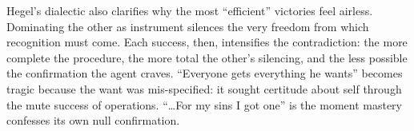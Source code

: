 Hegel's dialectic also clarifies why the most ``efficient'' victories feel airless. Dominating
the other as instrument silences the very freedom from which recognition must come. Each success,
then, intensifies the contradiction: the more complete the procedure, the more total the other's
silencing, and the less possible the confirmation the agent craves. ``Everyone gets everything
he wants'' becomes tragic because the want was mis-specified: it sought certitude about self
through the mute success of operations. ``\ldots For my sins I got one'' is the moment mastery
confesses its own null confirmation.
